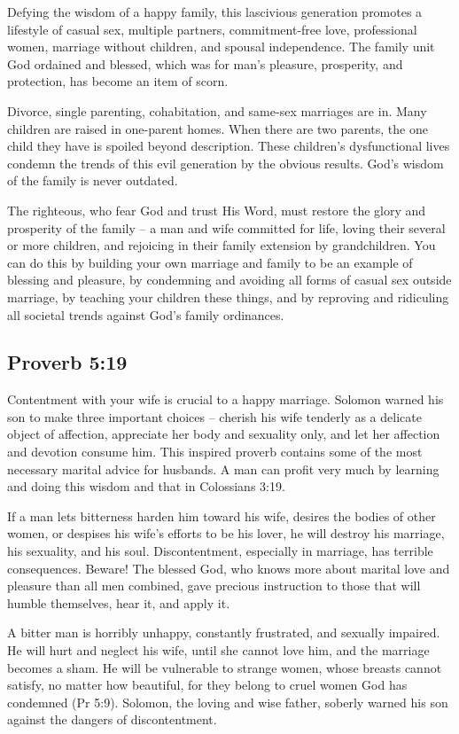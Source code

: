 Defying the wisdom of a happy family, this lascivious generation promotes a lifestyle of casual sex, multiple partners, commitment-free love, professional women, marriage without children, and spousal independence. The family unit God ordained and blessed, which was for man’s pleasure, prosperity, and protection, has become an item of scorn.

Divorce, single parenting, cohabitation, and same-sex marriages are in. Many children are raised in one-parent homes. When there are two parents, the one child they have is spoiled beyond description. These children’s dysfunctional lives condemn the trends of this evil generation by the obvious results. God’s wisdom of the family is never outdated.

The righteous, who fear God and trust His Word, must restore the glory and prosperity of the family – a man and wife committed for life, loving their several or more children, and rejoicing in their family extension by grandchildren. You can do this by building your own marriage and family to be an example of blessing and pleasure, by condemning and avoiding all forms of casual sex outside marriage, by teaching your children these things, and by reproving and ridiculing all societal trends against God’s family ordinances.

\subsection{Proverb 5:19}
Contentment with your wife is crucial to a happy marriage. Solomon warned his son to make three important choices – cherish his wife tenderly as a delicate object of affection, appreciate her body and sexuality only, and let her affection and devotion consume him. This inspired proverb contains some of the most necessary marital advice for husbands. A man can profit very much by learning and doing this wisdom and that in Colossians 3:19.

If a man lets bitterness harden him toward his wife, desires the bodies of other women, or despises his wife’s efforts to be his lover, he will destroy his marriage, his sexuality, and his soul. Discontentment, especially in marriage, has terrible consequences. Beware! The blessed God, who knows more about marital love and pleasure than all men combined, gave precious instruction to those that will humble themselves, hear it, and apply it.

A bitter man is horribly unhappy, constantly frustrated, and sexually impaired. He will hurt and neglect his wife, until she cannot love him, and the marriage becomes a sham. He will be vulnerable to strange women, whose breasts cannot satisfy, no matter how beautiful, for they belong to cruel women God has condemned (Pr 5:9). Solomon, the loving and wise father, soberly warned his son against the dangers of discontentment.

